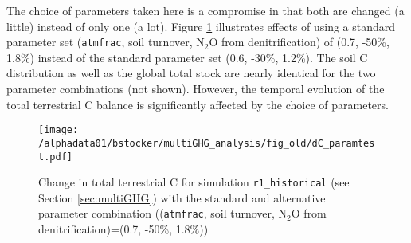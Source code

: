 \begin{itemize}
The choice of parameters taken here is a compromise in that both are changed (a little) instead of only one (a lot). Figure \ref{fig:paramtest2} illustrates effects of using a standard parameter set ({\tt atmfrac}, soil turnover, N$_2$O from denitrification) of (0.7, -50\%, 1.8\%) instead of the standard parameter set (0.6, -30\%, 1.2\%). The soil C distribution as well as the global total stock are nearly identical for the two parameter combinations (not shown). However, the temporal evolution of the total terrestrial C balance is significantly affected by the choice of parameters.


\begin{figure}[ht!]
\begin{center}
\texttt{[image: /alphadata01/bstocker/multiGHG\_analysis/fig\_old/dC\_paramtest.pdf]}
\end{center}
\caption{Change in total terrestrial C for simulation {\tt r1\_historical} (see Section \ref{sec:multiGHG}) with the standard and alternative parameter combination (({\tt atmfrac}, soil turnover, N$_2$O from denitrification)=(0.7, -50\%, 1.8\%))}
\label{fig:paramtest2}
\end{figure}



\end{itemize}

